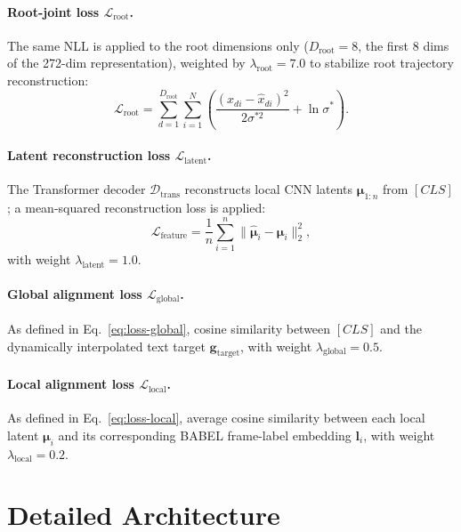 \documentclass{article}
\begin{document}
\paragraph{Root-joint loss $\mathcal{L}_{\text{root}}$.}
The same NLL is applied to the root dimensions only ($D_{\text{root}}=8$, the first 8 dims of the 272-dim representation), weighted by $\lambda_{\text{root}}=7.0$ to stabilize root trajectory reconstruction:
\begin{equation}
\mathcal{L}_{\text{root}} = \sum_{d=1}^{D_{\text{root}}}\sum_{i=1}^{N}
\left(\frac{(x_{di}-\hat{x}_{di})^2}{2\sigma^{*2}} + \ln\sigma^{*}\right).
\end{equation}

\paragraph{Latent reconstruction loss $\mathcal{L}_{\text{latent}}$.}
The Transformer decoder $\mathcal{D}_{\text{trans}}$ reconstructs local CNN latents $\boldsymbol{\mu}_{1:n}$ from $[CLS]$; a mean-squared reconstruction loss is applied:
\begin{equation}
\mathcal{L}_{\text{feature}} = \frac{1}{n}\sum_{i=1}^{n}\|\hat{\boldsymbol{\mu}}_i - \boldsymbol{\mu}_i\|_2^2,
\end{equation}
with weight $\lambda_{\text{latent}}=1.0$.

\paragraph{Global alignment loss $\mathcal{L}_{\text{global}}$.}
As defined in Eq.~\ref{eq:loss-global}, cosine similarity between $[CLS]$ and the dynamically interpolated text target $\mathbf{g}_{\text{target}}$, with weight $\lambda_{\text{global}}=0.5$.

\paragraph{Local alignment loss $\mathcal{L}_{\text{local}}$.}
As defined in Eq.~\ref{eq:loss-local}, average cosine similarity between each local latent $\boldsymbol{\mu}_i$ and its corresponding BABEL frame-label embedding $\mathbf{l}_i$, with weight $\lambda_{\text{local}}=0.2$.

\section{Detailed Architecture}
\label{app:arch}
\end{document}
